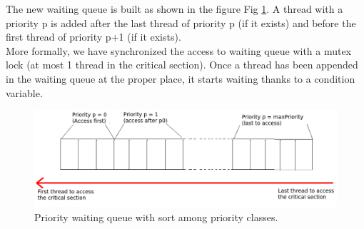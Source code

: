 \documentclass[a4paper]{article}
\begin{document}
The new waiting queue is built as shown in the figure Fig \ref{question4.png}.  A thread with a priority p is added after the last thread of priority p (if it exists) and before the first thread of priority p+1 (if it exists).\\

More formally, we have synchronized the access to waiting queue with a mutex lock (at most 1 thread in the critical section).  Once a thread has been appended in the waiting queue at the proper place, it starts waiting thanks to a condition variable.

\begin{figure}[ht!]
\center
\includegraphics[width=0.8\linewidth]{question4.png}
\caption{Priority waiting queue with sort among priority classes.}
\label{question4.png}
\end{figure}
\end{document}

